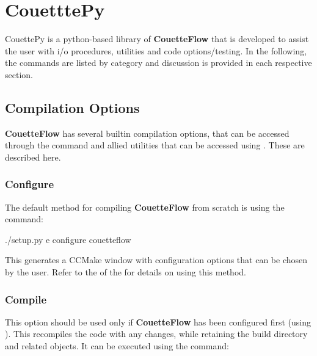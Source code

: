 \documentclass[letterpaper,10pt,english]{sphinxmanual}
\begin{document}
\section{CouetttePy}
\label{\detokenize{couettepy:couetttepy}}\label{\detokenize{couettepy::doc}}
CouettePy is a python-based library of {\color{red}\bfseries{}\textbar{}CouetteFlow\textbar{}} that is developed to assist the user with i/o procedures, utilities and code options/testing. In the following, the commands are listed by category and discussion is provided in each respective section.


\subsection{Compilation Options}
\label{\detokenize{couettepyfiles/compile::doc}}\label{\detokenize{couettepyfiles/compile:compilation-options}}
{\color{red}\bfseries{}\textbar{}CouetteFlow\textbar{}} has several builtin compilation options, that can be accessed through the command  and allied utilities that can be accessed using . These are described here.


\subsubsection{Configure}
\label{\detokenize{couettepyfiles/compile:configure}}
The default method for compiling {\color{red}\bfseries{}\textbar{}CouetteFlow\textbar{}} from scratch is using the command:

\begin{sphinxVerbatim}[commandchars=\\\{\}]
\PYGZdl{} ./setup.py \PYGZhy{}e configure couetteflow
\end{sphinxVerbatim}

This generates a CCMake window with configuration options that can be chosen by the user. Refer to the {\hyperref[\detokenize{setup:compilation}]{}} of the {\hyperref[\detokenize{setup:setup-couetteflow}]{}} for details on using this method.


\subsubsection{Compile}
\label{\detokenize{couettepyfiles/compile:compile}}
This option should be used only if {\color{red}\bfseries{}\textbar{}CouetteFlow\textbar{}} has been configured first (using ). This recompiles the code with any changes, while retaining the build directory and related objects. It can be executed using the command:
\end{document}
